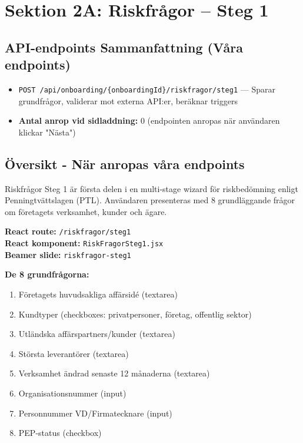 \section{Sektion 2A: Riskfrågor – Steg 1}

\subsection{API-endpoints Sammanfattning (Våra endpoints)}

\begin{itemize}[noitemsep]
  \item \texttt{POST /api/onboarding/\{onboardingId\}/riskfragor/steg1} — Sparar grundfrågor, validerar mot externa API:er, beräknar triggers
  \item \textbf{Antal anrop vid sidladdning:} 0 (endpointen anropas när användaren klickar "Nästa")
\end{itemize}

\subsection{Översikt - När anropas våra endpoints}

Riskfrågor Steg 1 är första delen i en multi-stage wizard för riskbedömning enligt Penningtvättslagen (PTL). Användaren presenteras med 8 grundläggande frågor om företagets verksamhet, kunder och ägare.

\textbf{React route:} \texttt{/riskfragor/steg1}\\
\textbf{React komponent:} \texttt{RiskFragorSteg1.jsx}\\
\textbf{Beamer slide:} \texttt{riskfragor-steg1}

\textbf{De 8 grundfrågorna:}
\begin{enumerate}[noitemsep]
  \item Företagets huvudsakliga affärsidé (textarea)
  \item Kundtyper (checkboxes: privatpersoner, företag, offentlig sektor)
  \item Utländska affärspartners/kunder (textarea)
  \item Största leverantörer (textarea)
  \item Verksamhet ändrad senaste 12 månaderna (textarea)
  \item Organisationsnummer (input)
  \item Personnummer VD/Firmatecknare (input)
  \item PEP-status (checkbox)
\end{enumerate}

